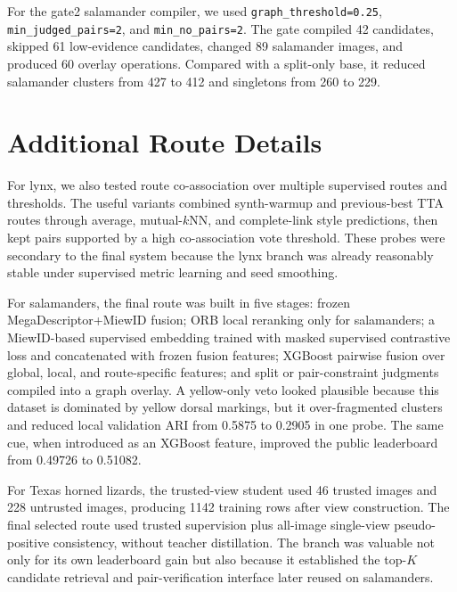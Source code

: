 \documentclass{ceurart}
\newcommand{\method}[1]{\texttt{#1}}
\begin{document}
For the gate2 salamander compiler, we used \method{graph\_threshold=0.25}, \method{min\_judged\_pairs=2}, and \method{min\_no\_pairs=2}. The gate compiled 42 candidates, skipped 61 low-evidence candidates, changed 89 salamander images, and produced 60 overlay operations. Compared with a split-only base, it reduced salamander clusters from 427 to 412 and singletons from 260 to 229.

\section{Additional Route Details}
\label{app:route-details}
For lynx, we also tested route co-association over multiple supervised routes and thresholds. The useful variants combined synth-warmup and previous-best TTA routes through average, mutual-$k$NN, and complete-link style predictions, then kept pairs supported by a high co-association vote threshold. These probes were secondary to the final system because the lynx branch was already reasonably stable under supervised metric learning and seed smoothing.

For salamanders, the final route was built in five stages: frozen MegaDescriptor+MiewID fusion; ORB local reranking only for salamanders; a MiewID-based supervised embedding trained with masked supervised contrastive loss and concatenated with frozen fusion features; XGBoost pairwise fusion over global, local, and route-specific features; and split or pair-constraint judgments compiled into a graph overlay. A yellow-only veto looked plausible because this dataset is dominated by yellow dorsal markings, but it over-fragmented clusters and reduced local validation ARI from 0.5875 to 0.2905 in one probe. The same cue, when introduced as an XGBoost feature, improved the public leaderboard from 0.49726 to 0.51082.

For Texas horned lizards, the trusted-view student used 46 trusted images and 228 untrusted images, producing 1142 training rows after view construction. The final selected route used trusted supervision plus all-image single-view pseudo-positive consistency, without teacher distillation. The branch was valuable not only for its own leaderboard gain but also because it established the top-$K$ candidate retrieval and pair-verification interface later reused on salamanders.
\end{document}
